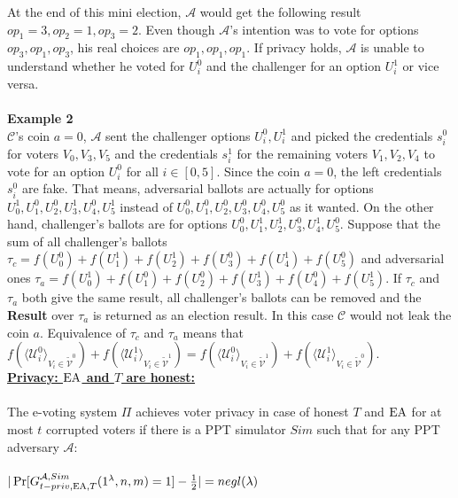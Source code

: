 At the end of this mini election,  $\mathcal{A}$ would get the following result $op_1 = 3, op_2 = 1, op_3 = 2$. Even though  $\mathcal{A}$'s intention was  to vote for options $op_3,op_1,op_3$, his real choices are $op_1,op_1,op_1$. If privacy holds, $\mathcal{A}$  is unable to understand whether he voted for $U_i^0$ and the challenger for an option $U_i^1$ or vice versa. \\\\
\textbf{Example 2}\\
$\mathcal{C}$'s coin $a=0$, $\mathcal{A}$ sent the challenger options $U_i^0,U_i^1$ and picked the credentials $s_i^0$ for voters $V_0,V_3,V_5$ and the credentials $s_i^1$ for the remaining voters $V_1,V_2,V_4$ to vote for an option $U_i^0$ for all $i \in [0,5]$. Since the coin $a=0$, the left credentials $s_i^0$ are fake. That means, adversarial ballots are actually for options $U_0^1,U_1^0,U_2^0,U_3^1,U_4^0,U_5^1$ instead of $U_0^0,U_1^0,U_2^0,U_3^0,U_4^0,U_5^0$ as it wanted. On the other hand, challenger's ballots are for options $U_0^0,U_1^1,U_2^1,U_3^0,U_4^1,U_5^0$. Suppose that  the sum of all challenger's ballots  $\tau_c = f(U_0^0) + f(U_1^1) + f(U_2^1) + f(U_3^0) + f(U_4^1) + f(U_5^0)$ and adversarial ones $\tau_a =  f(U_0^1) + f(U_1^0) + f(U_2^0) + f(U_3^1) + f(U_4^0) + f(U_5^1)$. If $\tau_c$ and $\tau_a$ both give the same result, all challenger's ballots can be removed and the \textbf{Result} over $\tau_a$ is returned as an election result. In this case $\mathcal{C}$ would not leak the coin $a$. Equivalence of $\tau_c$ and $\tau_a$ means that $f(\langle \mathcal{U}^0_i \rangle _{V_i \in \tilde{\mathcal{V}}^0} ) + f(\langle \mathcal{U}^1_i \rangle _{V_i \in \tilde{\mathcal{V}}^1} ) =  f(\langle \mathcal{U}^0_i \rangle _{V_i \in \tilde{\mathcal{V}}^1} ) +  f(\langle \mathcal{U}^1_i \rangle _{V_i \in \tilde{\mathcal{V}}^0} )$.\\

 
\underline{\textbf{Privacy: $\operatorname{EA}$ and $T$ are honest:}}\\\\
The e-voting system $\Pi$ achieves voter privacy in case of honest $T$ and $\operatorname{EA}$  for at most $t$ corrupted voters if there is a PPT simulator $Sim$ such that for any PPT adversary $\mathcal{A}$:\\\\
 $|\Pr[G_{t-priv,\operatorname{EA},T}^{\mathcal{A}, Sim}(1^{\lambda},n,m) = 1] - \frac{1}{2}| = negl(\lambda)$
